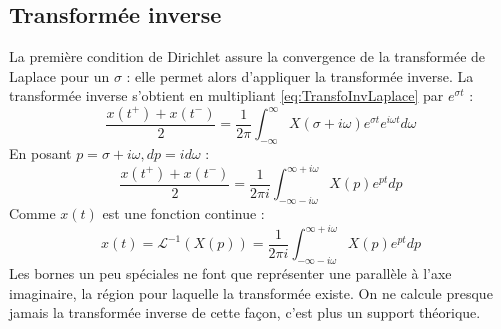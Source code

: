 	
	
\subsection{Transformée inverse}
La première condition de Dirichlet assure la convergence de la transformée de 
Laplace pour un $\sigma$ : elle permet alors d'appliquer la transformée inverse.
La transformée inverse s'obtient en multipliant \autoref{eq:TransfoInvLaplace} 
par $e^{\sigma t}$ :
\begin{equation}
	\frac{x(t^+)+x(t^-)}{2} = \frac{1}{2\pi}\int_{-\infty}^\infty X
	(\sigma + i\omega)e^{\sigma t} e^{i\omega t}d\omega
\end{equation}
En posant $p = \sigma + i\omega, dp = id\omega$ :
\begin{equation}
	\frac{x(t^+)+x(t^-)}{2} = \frac{1}{2\pi i}\int_{-\infty-i\omega}^{\infty+i\omega} X
	(p)e^{pt}dp
\end{equation}
Comme $x(t)$ est une fonction continue :
\begin{equation}
	x(t) = \mathcal{L}^{-1}(X(p)) = \frac{1}{2\pi i}\int_{-\infty-i\omega}^{\infty+i
		\omega} X(p)e^{pt}dp
\end{equation}
Les bornes un peu spéciales ne font que représenter une parallèle à l'axe 
imaginaire, la région pour laquelle la transformée existe. On ne calcule presque
jamais la transformée inverse de cette façon, c'est plus un support théorique.


